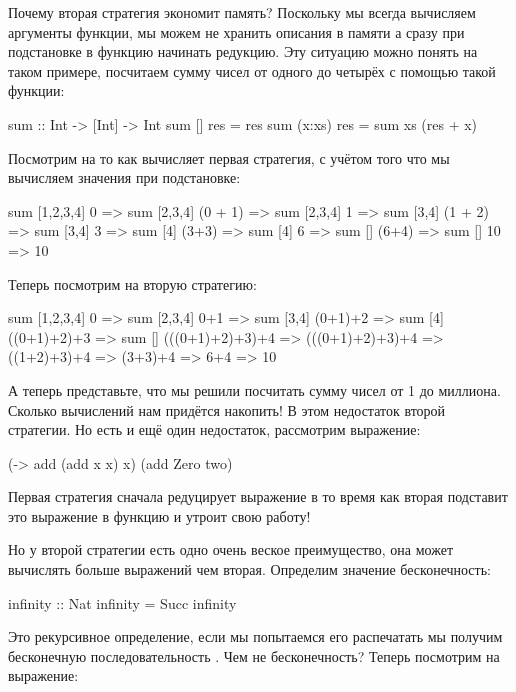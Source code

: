 Почему вторая стратегия экономит память? Поскольку мы всегда вычисляем
аргументы функции, мы можем не хранить описания в памяти а сразу при
подстановке в функцию начинать редукцию. Эту ситуацию можно понять на
таком примере, посчитаем сумму чисел от одного до четырёх с помощью
такой функции:


\begin{code}
sum :: Int -> [Int] -> Int
sum []      res = res
sum (x:xs)  res = sum xs (res + x) 
\end{code}

Посмотрим на то как вычисляет первая стратегия, с учётом того что мы
вычисляем значения при подстановке:


\begin{code}
        sum [1,2,3,4] 0
=>      sum [2,3,4]   (0 + 1)    
=>      sum [2,3,4]   1
=>      sum [3,4]     (1 + 2)
=>      sum [3,4]     3
=>      sum [4]       (3+3)
=>      sum [4]       6
=>      sum []        (6+4)
=>      sum []        10
=>      10
\end{code}

Теперь посмотрим на вторую стратегию:


\begin{code}
        sum [1,2,3,4] 0
=>      sum [2,3,4]   0+1
=>      sum [3,4]     (0+1)+2
=>      sum [4]       ((0+1)+2)+3
=>      sum []        (((0+1)+2)+3)+4
=>      (((0+1)+2)+3)+4
=>      ((1+2)+3)+4
=>      (3+3)+4
=>      6+4
=>      10
\end{code}

А теперь представьте, что мы решили посчитать сумму чисел от 1 до
миллиона. Сколько вычислений нам придётся накопить! В этом недостаток
второй стратегии. Но есть и ещё один недостаток, рассмотрим выражение:


\begin{code}
(\x -> add (add x x) x) (add Zero two)
\end{code}

Первая стратегия сначала редуцирует выражение  в то
время как вторая подставит это выражение в функцию и утроит свою работу!

Но у второй стратегии есть одно очень веское преимущество, она может
вычислять больше выражений чем вторая. Определим значение бесконечность:


\begin{code}
infinity    :: Nat
infinity    = Succ infinity
\end{code}

Это рекурсивное определение, если мы попытаемся его распечатать мы
получим бесконечную последовательность . Чем не бесконечность?
Теперь посмотрим на выражение:


